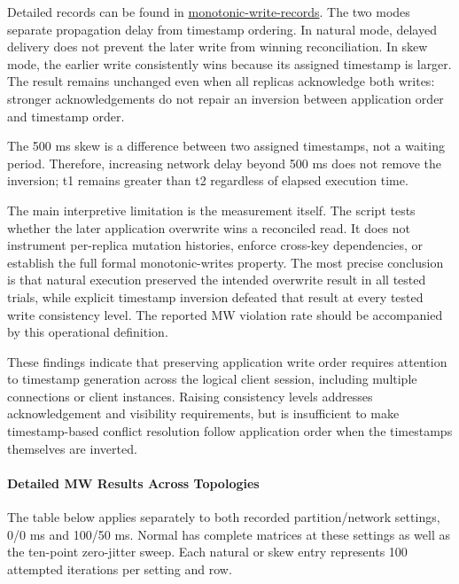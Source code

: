Detailed records can be found in \href{https://github.com/LuweiChenbot/Cassandra-Lab/blob/main/results/mw.csv}{monotonic-write-records}. The two modes separate propagation delay from timestamp ordering. In natural mode, delayed delivery does not prevent the later write from winning reconciliation. In skew mode, the earlier write consistently wins because its assigned timestamp is larger. The result remains unchanged even when all replicas acknowledge both writes: stronger acknowledgements do not repair an inversion between application order and timestamp order.

The 500 ms skew is a difference between two assigned timestamps, not a waiting period. Therefore, increasing network delay beyond 500 ms does not remove the inversion; t1 remains greater than t2 regardless of elapsed execution time.

The main interpretive limitation is the measurement itself. The script tests whether the later application overwrite wins a reconciled read. It does not instrument per-replica mutation histories, enforce cross-key dependencies, or establish the full formal monotonic-writes property. The most precise conclusion is that natural execution preserved the intended overwrite result in all tested trials, while explicit timestamp inversion defeated that result at every tested write consistency level. The reported MW violation rate should be accompanied by this operational definition.

These findings indicate that preserving application write order requires attention to timestamp generation across the logical client session, including multiple connections or client instances. Raising consistency levels addresses acknowledgement and visibility requirements, but is insufficient to make timestamp-based conflict resolution follow application order when the timestamps themselves are inverted.

\paragraph{Detailed MW Results Across Topologies}\label{mw:detailed-mw-results-across-topologies}

The table below applies separately to both recorded partition/network settings, 0/0 ms and 100/50 ms. Normal has complete matrices at these settings as well as the ten-point zero-jitter sweep. Each natural or skew entry represents 100 attempted iterations per setting and row.

